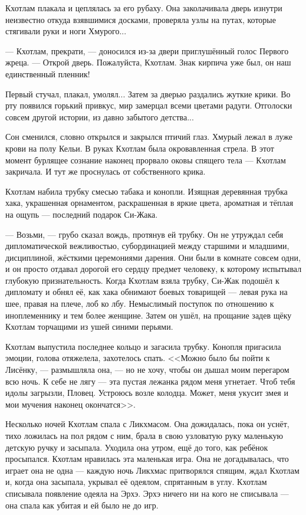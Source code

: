\documentclass[a4paper,10pt,fleqn]{book}\usepackage{cooltooltips}\usepackage{polyglossia}\setdefaultlanguage{english}\setotherlanguage{russian}\defaultfontfeatures{Ligatures=TeX,Mapping=tex-text} \usepackage{xcolor}\definecolor{lightgray}{HTML}{bbbbbb}\color{lightgray}\newcommand{\ml}[3]{\textcolor{black}{#3}}
\begin{document}
Кхотлам плакала и цеплялась за его рубаху.
Она заколачивала дверь изнутри неизвестно откуда взявшимися досками, проверяла узлы на путах, которые стягивали руки и ноги Хмурого...

--- Кхотлам, прекрати, --- доносился из-за двери приглушённый голос Первого жреца.
--- Открой дверь.
Пожалуйста, Кхотлам.
Знак кирпича уже был, он наш единственный пленник!

Первый стучал, плакал, умолял...
Затем за дверью раздались жуткие крики.
Во рту появился горький привкус, мир замерцал всеми цветами радуги.
Отголоски совсем другой истории, из давно забытого детства...

Сон сменился, словно открылся и закрылся птичий глаз.
Хмурый лежал в луже крови на полу Кельи.
В руках Кхотлам была окровавленная стрела.
В этот момент бурлящее сознание наконец прорвало оковы спящего тела --- Кхотлам закричала.
И тут же проснулась от собственного крика.

Кхотлам набила трубку смесью табака и конопли.
Изящная деревянная трубка хака, украшенная орнаментом, раскрашенная в яркие цвета, ароматная и тёплая на ощупь --- последний подарок Си-Жака.

--- Возьми, --- грубо сказал вождь, протянув ей трубку.
Он не утруждал себя дипломатической вежливостью, субординацией между старшими и младшими, дисциплиной, жёсткими церемониями дарения.
Они были в комнате совсем одни, и он просто отдавал дорогой его сердцу предмет человеку, к которому испытывал глубокую признательность.
Когда Кхотлам взяла трубку, Си-Жак подошёл к дипломату и обнял её, как хака обнимают боевых товарищей --- левая рука на шее, правая на плече, лоб ко лбу.
Немыслимый поступок по отношению к иноплеменнику и тем более женщине.
Затем он ушёл, на прощание задев щёку Кхотлам торчащими из ушей синими перьями.

Кхотлам выпустила последнее кольцо и загасила трубку.
Конопля пригасила эмоции, голова отяжелела, захотелось спать.
<<Можно было бы пойти к Лисёнку, --- размышляла она, --- но не хочу, чтобы он дышал моим перегаром всю ночь.
К себе не лягу --- эта пустая лежанка рядом меня угнетает.
Чтоб тебя идолы загрызли, Пловец.
Устроюсь возле колодца.
Может, меня укусит змея и мои мучения наконец окончатся>>.

Несколько ночей Кхотлам спала с Ликхмасом.
Она дожидалась, пока он уснёт, тихо ложилась на пол рядом с ним, брала в свою узловатую руку маленькую детскую ручку и засыпала.
Уходила она утром, ещё до того, как ребёнок просыпался.
Кхотлам нравилась эта маленькая игра.
Она не догадывалась, что играет она не одна --- каждую ночь Ликхмас притворялся спящим, ждал Кхотлам и, когда она засыпала, укрывал её одеялом, спрятанным в углу.
Кхотлам списывала появление одеяла на Эрхэ.
Эрхэ ничего ни на кого не списывала --- она спала как убитая и ей было не до игр.
\end{document}
